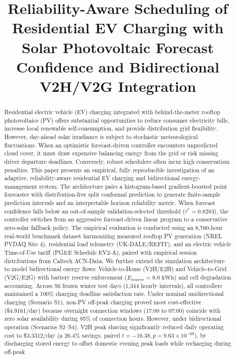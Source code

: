 \documentclass[conference]{IEEEtran}
\begin{document}
\title{Reliability-Aware Scheduling of Residential EV Charging with Solar Photovoltaic Forecast Confidence and Bidirectional V2H/V2G Integration}

\author{
}

\maketitle

\begin{abstract}
Residential electric vehicle (EV) charging integrated with behind-the-meter rooftop photovoltaics (PV) offers substantial opportunities to reduce consumer electricity bills, increase local renewable self-consumption, and provide distribution grid flexibility. However, day-ahead solar irradiance is subject to stochastic meteorological fluctuations. When an optimistic forecast-driven controller encounters unpredicted cloud cover, it must draw expensive balancing energy from the grid or risk missing driver departure deadlines. Conversely, robust schedulers often incur high conservatism penalties. This paper presents an empirical, fully reproducible investigation of an adaptive, reliability-aware residential EV charging and bidirectional energy-management system. The architecture pairs a histogram-based gradient-boosted point forecaster with distribution-free split conformal prediction to generate finite-sample prediction intervals and an interpretable horizon reliability metric. When forecast confidence falls below an out-of-sample validation-selected threshold ($\tau^* = 0.8283$), the controller switches from an aggressive forecast-driven linear program to a conservative zero-solar fallback policy. The empirical evaluation is conducted using an 8,760-hour real-world benchmark dataset harmonizing measured rooftop PV generation (NREL PVDAQ Site 4), residential load telemetry (UK-DALE/REFIT), and an electric vehicle Time-of-Use tariff (PG\&E Schedule EV2-A), paired with empirical session distributions from Caltech ACN-Data. We further extend the simulation architecture to model bidirectional energy flows: Vehicle-to-Home (V2H/E2H) and Vehicle-to-Grid (V2G/E2G) with battery reserve enforcement ($E_{\text{reserve}} = 8.0\text{ kWh}$) and cell degradation accounting. Across 56 frozen winter test days (1,344 hourly intervals), all controllers maintained a 100\% charging deadline satisfaction rate. Under nominal unidirectional charging (Scenario S1), non-PV off-peak charging proved most cost-effective (\$4.9161/day) because overnight connection windows (17:00 to 07:00) coincide with zero solar availability during 85\% of connection hours. However, under bidirectional operation (Scenarios S2--S4), V2H peak shaving significantly reduced daily operating cost to \$3.3312/day (a 26.4\% savings, paired $t = -16.38, p = 9.63 \times 10^{-69}$), by discharging stored energy to offset domestic evening peak loads while recharging during off-peak 
\end{abstract}
\end{document}
